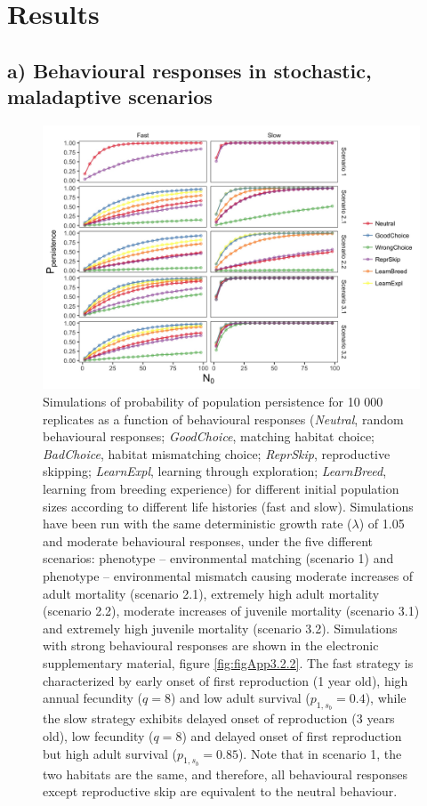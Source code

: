 \section{Results}

\subsection*{a) Behavioural responses in stochastic, maladaptive scenarios}

\begin{figure}
\centering
\includegraphics[width=\textwidth]{./Figures/chapter03/Fig_1.jpg}
\caption[Persistence as a function of LH, behviour and scenario]{
Simulations of probability of population persistence for 10 000 replicates as a function of behavioural responses (\emph{Neutral}, random behavioural responses;
\emph{GoodChoice}, matching habitat choice; \emph{BadChoice}, habitat mismatching choice; \emph{ReprSkip}, reproductive skipping; \emph{LearnExpl}, learning through exploration; \emph{LearnBreed},
learning from breeding experience) for different initial population sizes according to different life histories (fast and slow). Simulations have been run with the same
deterministic growth rate ($\lambda$) of 1.05 and moderate behavioural responses, under the five different scenarios: phenotype – environmental matching (scenario 1) and
phenotype – environmental mismatch causing moderate increases of adult mortality (scenario 2.1), extremely high adult mortality (scenario 2.2), moderate increases
of juvenile mortality (scenario 3.1) and extremely high juvenile mortality (scenario 3.2). Simulations with strong behavioural responses are shown in the electronic
supplementary material, figure \ref{fig:figApp3.2.2}. The fast strategy is characterized by early onset of first reproduction (1 year old), high annual fecundity ($q = 8$) and low adult
survival ($p_{1,s_{b}} = 0.4$), while the slow strategy exhibits delayed onset of reproduction (3 years old), low fecundity ($q = 8$) and delayed onset of first reproduction
but high adult survival ($p_{1,s_{b}} = 0.85$). Note that in scenario 1, the two habitats are the same, and therefore, all behavioural responses except reproductive skip are
equivalent to the neutral behaviour.}
\label{fig:fig3.1}
\end{figure}


